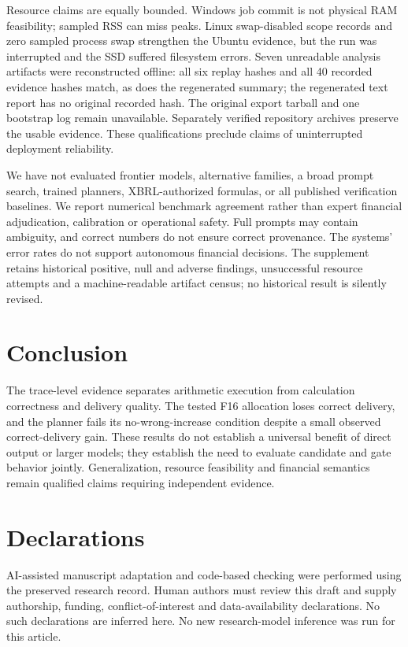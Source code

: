\documentclass[pdflatex,sn-mathphys-num]{sn-jnl}
\begin{document}
Resource claims are equally bounded. Windows job commit is not physical RAM feasibility; sampled RSS can miss peaks. Linux swap-disabled scope records and zero sampled process swap strengthen the Ubuntu evidence, but the run was interrupted and the SSD suffered filesystem errors. Seven unreadable analysis artifacts were reconstructed offline: all six replay hashes and all 40 recorded evidence hashes match, as does the regenerated summary; the regenerated text report has no original recorded hash. The original export tarball and one bootstrap log remain unavailable. Separately verified repository archives preserve the usable evidence. These qualifications preclude claims of uninterrupted deployment reliability.

We have not evaluated frontier models, alternative families, a broad prompt search, trained planners, XBRL-authorized formulas, or all published verification baselines. We report numerical benchmark agreement rather than expert financial adjudication, calibration or operational safety. Full prompts may contain ambiguity, and correct numbers do not ensure correct provenance. The systems' error rates do not support autonomous financial decisions. The supplement retains historical positive, null and adverse findings, unsuccessful resource attempts and a machine-readable artifact census; no historical result is silently revised.



\section{Conclusion}
The trace-level evidence separates arithmetic execution from calculation correctness and delivery quality. The tested F16 allocation loses correct delivery, and the planner fails its no-wrong-increase condition despite a small observed correct-delivery gain. These results do not establish a universal benefit of direct output or larger models; they establish the need to evaluate candidate and gate behavior jointly. Generalization, resource feasibility and financial semantics remain qualified claims requiring independent evidence.
\section*{Declarations}
AI-assisted manuscript adaptation and code-based checking were performed using the preserved research record. Human authors must review this draft and supply authorship, funding, conflict-of-interest and data-availability declarations. No such declarations are inferred here. No new research-model inference was run for this article.

\end{document}
